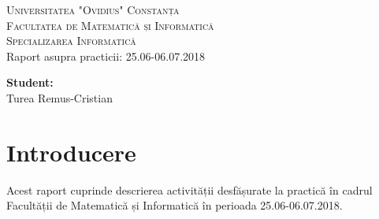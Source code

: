 \documentclass{report}
\begin{document}
\begin{titlepage}
 \begin{figure}
\end{figure}
\begin{center}
    \textsc{\normalsize Universitatea "Ovidius" Constanța\\
  Facultatea de Matematică și Informatică\\
  Specializarea Informatică}\\
  [4cm]
    {\Large \sc Raport asupra practicii: 25.06-06.07.2018}\\[7cm]
    \begin{flushright} \large
    \textbf{Student:\ \ \ \ \ } \\
    Turea Remus-Cristian
   \end{flushright}
  \vfill
 \end{center}
\end{titlepage}

\tableofcontents
\chapter{Introducere}

Acest raport cuprinde descrierea activității desfășurate la practică  în cadrul Facultății de Matematică și Informatică în perioada 25.06-06.07.2018.
\end{document}
